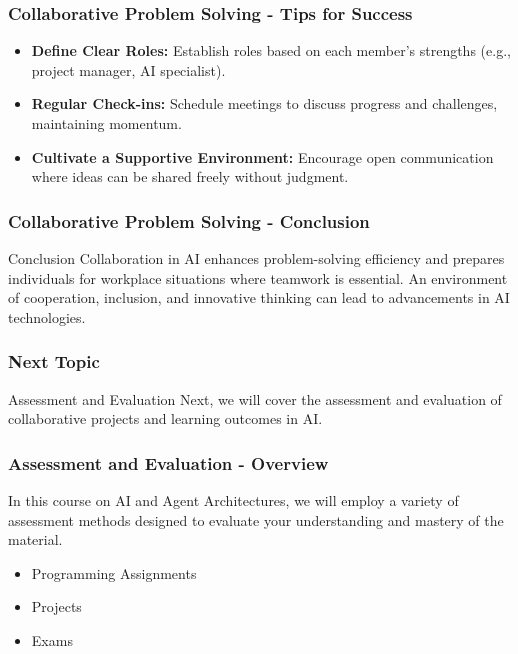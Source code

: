 \documentclass[aspectratio=169]{beamer}
\begin{document}
\begin{frame}[fragile]
    \frametitle{Collaborative Problem Solving - Tips for Success}
    \begin{itemize}
        \item \textbf{Define Clear Roles:} Establish roles based on each member’s strengths (e.g., project manager, AI specialist).
        \item \textbf{Regular Check-ins:} Schedule meetings to discuss progress and challenges, maintaining momentum.
        \item \textbf{Cultivate a Supportive Environment:} Encourage open communication where ideas can be shared freely without judgment.
    \end{itemize}
\end{frame}

\begin{frame}[fragile]
    \frametitle{Collaborative Problem Solving - Conclusion}
    \begin{block}{Conclusion}
        Collaboration in AI enhances problem-solving efficiency and prepares individuals for workplace situations where teamwork is essential. An environment of cooperation, inclusion, and innovative thinking can lead to advancements in AI technologies.
    \end{block}
\end{frame}

\begin{frame}[fragile]
    \frametitle{Next Topic}
    \begin{block}{Assessment and Evaluation}
        Next, we will cover the assessment and evaluation of collaborative projects and learning outcomes in AI.
    \end{block}
\end{frame}

\begin{frame}[fragile]
    \frametitle{Assessment and Evaluation - Overview}
    In this course on AI and Agent Architectures, we will employ a variety of assessment methods designed to evaluate your understanding and mastery of the material.
    
    \begin{itemize}
        \item Programming Assignments
        \item Projects
        \item Exams
    \end{itemize}
\end{frame}
\end{document}
